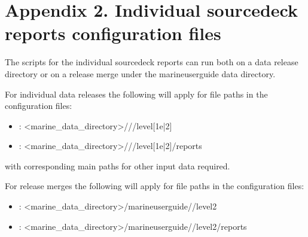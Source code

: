 \documentclass[letterpaper,10pt,english]{sphinxmanual}
\begin{document}
\begin{sphinxVerbatim}[commandchars=\\\{\}]
\end{sphinxVerbatim}


\chapter{Appendix 2. Individual source\sphinxhyphen{}deck reports configuration files}
\label{\detokenize{index:appendix-2-individual-source-deck-reports-configuration-files}}\label{\detokenize{index:appendix-sd}}
The scripts for the individual source\sphinxhyphen{}deck reports can run both on a data release
directory or on a release merge under the marine\sphinxhyphen{}user\sphinxhyphen{}guide data directory.

For individual data releases the following will apply for file paths in
the configuration files:
\begin{itemize}
\item {} 
: \textless{}marine\_data\_directory\textgreater{}///level{[}1e|2{]}

\item {} 
:  \textless{}marine\_data\_directory\textgreater{}///level{[}1e|2{]}/reports

\end{itemize}

with corresponding main paths for other input data required.

For release merges the following will apply for file paths in
the configuration files:
\begin{itemize}
\item {} 
: \textless{}marine\_data\_directory\textgreater{}/marine\sphinxhyphen{}user\sphinxhyphen{}guide//level2

\item {} 
:  \textless{}marine\_data\_directory\textgreater{}/marine\sphinxhyphen{}user\sphinxhyphen{}guide//level2/reports

\end{itemize}
\end{document}

